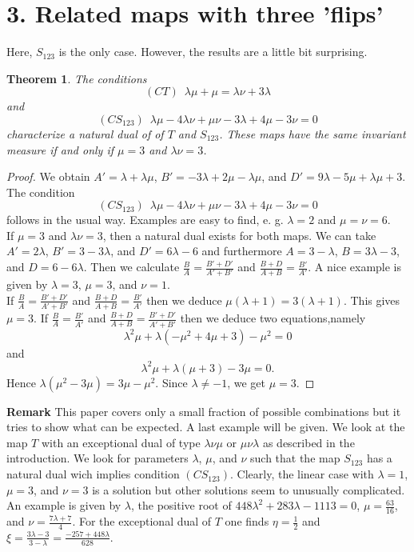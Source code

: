 \documentclass[12pt]{article}
\newtheorem{theorem}{Theorem}
\begin{document}
\section*{3. Related maps with three 'flips'}
Here, $S_{123}$ is the only case. However, the results are a little bit surprising.
\begin{theorem}
The conditions 
		$$(CT) \, \, \, \lambda \mu + \mu = \lambda \nu + 3 \lambda$$ and 
		$$ (CS_{123}) \,\,\, \lambda \mu - 4 \lambda \nu + \mu \nu - 3 \lambda + 4 \mu - 3 \nu =0$$ characterize a natural dual of of $T$ and $S_{123}$. These maps have the same invariant measure if and only if $\mu =3$ and $\lambda \nu =3$.
\end{theorem}
\begin{proof}
We obtain $A' = \lambda + \lambda \mu$, $B'= - 3\lambda + 2 \mu - \lambda\mu$, and $D'= 9 \lambda - 5 \mu + \lambda \mu +3$. The condition
$$ (CS_{123}) \,\,\, \lambda \mu - 4 \lambda \nu + \mu \nu - 3 \lambda + 4 \mu - 3 \nu =0$$ follows in the usual way. Examples are easy to find, e. g. $\lambda = 2$ and $\mu = \nu =6$.\\
If $\mu =3$ and $\lambda \nu =3$, then a natural dual exists for both maps. We can take $A' = 2 \lambda$, $B' = 3- 3 \lambda$, and $D' = 6 \lambda -6$ and furthermore 
$A = 3 - \lambda$, $B = 3 \lambda - 3$, and $D = 6 -6 \lambda$. Then we calculate $\frac{B}{A} = \frac{B' + D'}{A'+B'}$ and $\frac{B+D}{A+B}=\frac{B'}{A'}$. A nice example is given by $\lambda  =3$,  $\mu = 3$, and $ \nu =1$.\\
If $\frac{B}{A} = \frac{B' + D'}{A'+B'}$ and $\frac{B+D}{A+B}=\frac{B'}{A'}$ then we deduce 
 $\mu(\lambda +1) = 3 (\lambda +1) $. This gives $\mu =3$. 
If $\frac{B}{A} = \frac{B'}{A'}$ and $\frac{B+D}{A+B}=\frac{B'+D'}{A'+B'}$ then we deduce two equations,namely
$$\lambda^2 \mu  + \lambda ( -\mu^2 + 4 \mu +3) - \mu^2 = 0$$
and 
$$\lambda^2 \mu  +  \lambda (\mu +3) -3 \mu = 0.$$ Hence $\lambda(\mu^2 - 3 \mu) = 3\mu - \mu^2. $ Since $\lambda \neq -1$, we get $\mu = 3$.
\end{proof}
 {\bf Remark}
 This paper covers only a small fraction of possible combinations  but it tries to show what can be expected. A last example will be given. We look at the map $T$ with an exceptional dual of type $\lambda \nu \mu$ or $\mu \nu \lambda$  as described in the introduction. We look for parameters $\lambda$, $\mu$, and $\nu$ such that the map $S_{123}$ has a natural dual wich implies condition 
 $ (CS_{123})$. Clearly, the linear case with $\lambda =1$, $\mu = 3$, and $\nu =3 $ is a solution but other solutions seem to unusually complicated. An example is given by $\lambda $, the positive root of $448 \lambda^2 +283 \lambda - 1113 =0$, $\mu = \frac{63}{16}$, and $\nu = \frac{7 \lambda + 7}{4}$. For the exceptional dual of $T$ one finds $\eta = \frac{1}{2}$ and $\xi = \frac{3 \lambda - 3}{3 - \lambda} = \frac{-257 +448 \lambda}{628}$.
 
\end{document}
